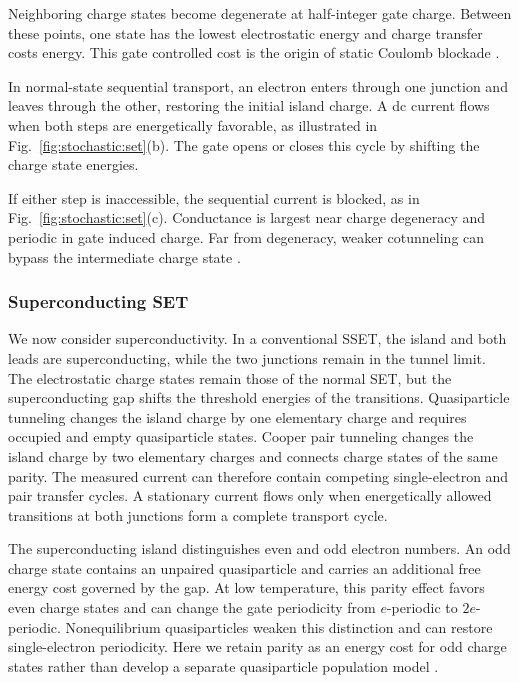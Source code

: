             Neighboring charge states become degenerate at half-integer gate charge. Between these points, one state has the lowest electrostatic energy and charge transfer costs energy. This gate controlled cost is the origin of static Coulomb blockade \cite{ingold_charge_1992,grabert_single_2013}.

            In normal-state sequential transport, an electron enters through one junction and leaves through the other, restoring the initial island charge. A dc current flows when both steps are energetically favorable, as illustrated in Fig.~\ref{fig:stochastic:set}(b). The gate opens or closes this cycle by shifting the charge state energies.

            If either step is inaccessible, the sequential current is blocked, as in Fig.~\ref{fig:stochastic:set}(c). Conductance is largest near charge degeneracy and periodic in gate induced charge. Far from degeneracy, weaker cotunneling can bypass the intermediate charge state \cite{ingold_charge_1992,grabert_single_2013}.
        
        \subsubsection*{Superconducting SET}

            We now consider superconductivity. In a conventional SSET, the island and both leads are superconducting, while the two junctions remain in the tunnel limit. The electrostatic charge states remain those of the normal SET, but the superconducting gap shifts the threshold energies of the transitions. Quasiparticle tunneling changes the island charge by one elementary charge and requires occupied and empty quasiparticle states. Cooper pair tunneling changes the island charge by two elementary charges and connects charge states of the same parity. The measured current can therefore contain competing single-electron and pair transfer cycles. A stationary current flows only when energetically allowed transitions at both junctions form a complete transport cycle.

            The superconducting island distinguishes even and odd electron numbers. An odd charge state contains an unpaired quasiparticle and carries an additional free energy cost governed by the gap. At low temperature, this parity effect favors even charge states and can change the gate periodicity from $e$-periodic to $2e$-periodic. Nonequilibrium quasiparticles weaken this distinction and can restore single-electron periodicity. Here we retain parity as an energy cost for odd charge states rather than develop a separate quasiparticle population model \cite{grabert_single_2013}.

